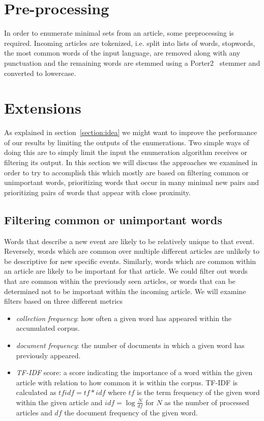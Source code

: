 \section{Pre-processing}
\label{method:preprocessing}
In order to enumerate minimal sets from an article, some preprocessing is required. Incoming articles are tokenized, i.e. split into lists of words, stopwords, the most common words of the input language, are removed along with any punctuation and the remaining words are stemmed using a Porter2~\cite{porter2002english} stemmer and converted to lowercase.

\section{Extensions}
As explained in section~\ref{section:idea} we might want to improve the performance of our results by limiting the outputs of the enumerations. Two simple ways of doing this are to simply limit the input the enumeration algorithm receives or filtering its output.
In this section we will discuss the approaches we examined in order to try to accomplish this which mostly are based on filtering common or unimportant words, prioritizing words that occur in many minimal new pairs and prioritizing pairs of words that appear with close proximity.

\subsection{Filtering common or unimportant words}
Words that describe a new event are likely to be relatively unique to that event. Reversely, words which are common over multiple different articles are unlikely to be descriptive for new specific events. Similarly, words which are common within an article are likely to be important for that article. We could filter out words that are common within the previously seen articles, or words that can be determined not to be important within the incoming article. We will examine filters based on three different metrics
\begin{itemize}
  \item \emph{collection frequency}: how often a given word has appeared within the accumulated corpus.
  \item \emph{document frequency}: the number of documents in which a given word has previously appeared.
  \item \emph{TF-IDF} score: a score indicating the importance of a word within the given article with relation to how common it is within the corpus. TF-IDF is calculated as $tfidf = tf*idf$ where $tf$ is the term frequency of the given word within the given article and $idf = \log{\frac{N}{df}}$ for $N$ as the number of processed articles and $df$ the document frequency of the given word.
\end{itemize}

